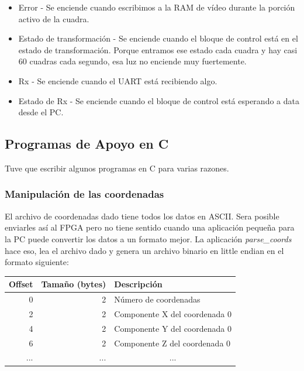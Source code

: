 \documentclass[a4paper]{article}
\begin{document}
\begin{itemize}[noitemsep]
\item Error - Se enciende cuando escribimos a la RAM de vídeo durante la porción activo de la cuadra.
\item Estado de transformación - Se enciende cuando el bloque de control está en el estado de transformación. Porque entramos ese estado cada cuadra y hay casi 60 cuadras cada segundo, esa luz no enciende muy fuertemente.
\item Rx - Se enciende cuando el UART está recibiendo algo.
\item Estado de Rx - Se enciende cuando el bloque de control está esperando a data desde el PC.
\end{itemize}

\subsection {Programas de Apoyo en C}

Tuve que escribir algunos programas en C para varias razones.

\subsubsection{Manipulación de las coordenadas}

El archivo de coordenadas dado tiene todos los datos en ASCII. Sera posible enviarles así al FPGA pero no tiene sentido cuando una aplicación pequeña para la PC puede convertir los datos a un formato mejor. La aplicación \textit{parse\_coords} hace eso, lea el archivo dado y genera un archivo binario en little endian en el formato siguiente: \\

\begin{tabular}{ | r | r | l | } \hline
\textbf{Offset} & \textbf{Tamaño (bytes)} & \textbf{Descripción} \\ \hline
0 & 2 & Número de coordenadas \\
2 & 2 & Componente X del coordenada 0 \\
4 & 2 & Componente Y del coordenada 0 \\
6 & 2 & Componente Z del coordenada 0 \\
\multicolumn{1}{|r|}{...} & \multicolumn{1}{|r|}{...} & \multicolumn{1}{|c|}{...} \\ \hline
\end{tabular} \\
\end{document}
